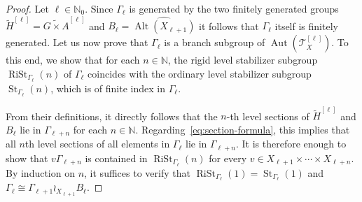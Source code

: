 \documentclass[a4paper]{amsart}
\numberwithin{equation}{section}
\theoremstyle{definition}
\theoremstyle{remark}
\newcommand{\N}{\mathbb{N}}
\DeclareMathOperator{\Alt}{Alt}
\DeclareMathOperator{\Aut}{Aut}
\DeclareMathOperator{\RiSt}{RiSt}
\DeclareMathOperator{\St}{St}
\newcommand{\T}{\mathcal{T}}
\begin{document}
\begin{proof}
Let $\ell \in \N_0$.
Since $\Gamma_\ell$ is generated by the two finitely generated groups $\widetilde{H}^{[\ell]} = \widetilde{G\times A}^{[\ell]}$ and $B_\ell = \widehat{\Alt(X_{\ell+1})}$ it follows that $\Gamma_\ell$ itself is finitely generated.
Let us now prove that $\Gamma_{\ell}$ is a branch subgroup of $\Aut(\T_X^{[\ell]})$.
To this end, we show that for each $n \in \N$, the rigid level stabilizer subgroup $\RiSt_{\Gamma_{\ell}}(n)$ of $\Gamma_{\ell}$ coincides with the ordinary level stabilizer subgroup $\St_{\Gamma_{\ell}}(n)$, which is of finite index in $\Gamma_{\ell}$.

From their definitions, it directly follows that the $n$-th level sections of $\widetilde{H}^{[\ell]}$ and $B_{\ell}$ lie in $\Gamma_{\ell+n}$ for each $n\in \N$.
Regarding~\eqref{eq:section-formula}, this implies that all $n$th level sections of all elements in $\Gamma_{\ell}$ lie in $\Gamma_{\ell+n}$.
It is therefore enough to show that $v\Gamma_{\ell+n}$ is contained in $\RiSt_{\Gamma_{\ell}}(n)$ for every $v \in X_{\ell+1} \times \cdots \times X_{\ell+n}$.
By induction on $n$, it suffices to verify that $\RiSt_{\Gamma_{\ell}}(1) = \St_{\Gamma_{\ell}}(1)$ and $\Gamma_{\ell} \cong \Gamma_{\ell+1} \wr_{X_{\ell+1}} B_{\ell}$.


\end{proof}
\end{document}
